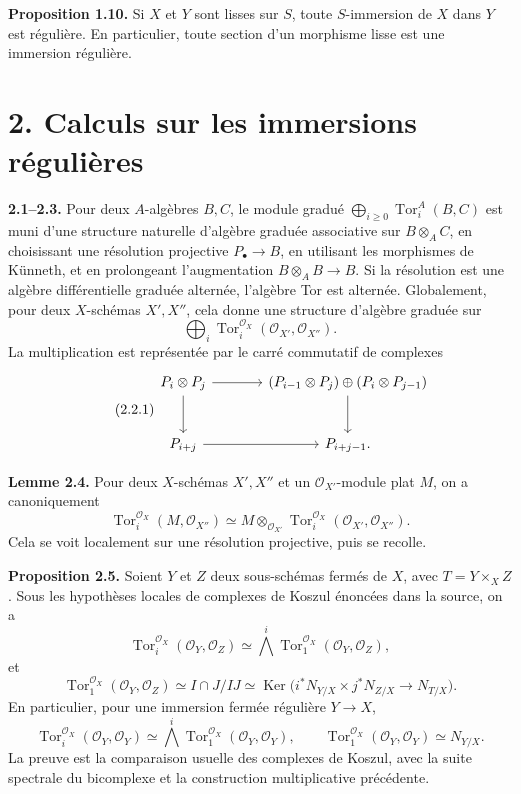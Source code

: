 \documentclass[11pt]{article}
\newcommand{\Tor}{\operatorname{Tor}}
\providecommand{\Tor}{\operatorname{Tor}}
\providecommand{\Ker}{\operatorname{Ker}}
\providecommand{\cO}{\mathcal O}
\begin{document}
\textbf{Proposition 1.10.} Si \(X\) et \(Y\) sont lisses sur \(S\), toute \(S\)-immersion de \(X\) dans \(Y\) est régulière. En particulier, toute section d'un morphisme lisse est une immersion régulière.

\section*{2. Calculs sur les immersions régulières}

\textbf{2.1--2.3.} Pour deux \(A\)-algèbres \(B,C\), le module gradué \(\bigoplus_{i\ge0}\Tor_i^A(B,C)\) est muni d'une structure naturelle d'algèbre graduée associative sur \(B\otimes_A C\), en choisissant une résolution projective \(P_\bullet\to B\), en utilisant les morphismes de Künneth, et en prolongeant l'augmentation \(B\otimes_A B\to B\). Si la résolution est une algèbre différentielle graduée alternée, l'algèbre Tor est alternée. Globalement, pour deux \(X\)-schémas \(X',X''\), cela donne une structure d'algèbre graduée sur
\[
\bigoplus_i\Tor_i^{\cO_X}(\cO_{X'},\cO_{X''}).
\]
La multiplication est représentée par le carré commutatif de complexes
\begin{equation}\tag{2.2.1}
\begin{tikzcd}[column sep=large,row sep=large]
P_i\otimes P_j \arrow[r] \arrow[d] & (P_{i-1}\otimes P_j)\oplus(P_i\otimes P_{j-1}) \arrow[d]\\
P_{i+j} \arrow[r] & P_{i+j-1}.
\end{tikzcd}
\end{equation}

\textbf{Lemme 2.4.} Pour deux \(X\)-schémas \(X',X''\) et un \(\cO_{X'}\)-module plat \(M\), on a canoniquement
\begin{equation}\tag{2.4.1}
\Tor_i^{\cO_X}(M,\cO_{X''})\simeq
M\otimes_{\cO_{X'}}\Tor_i^{\cO_X}(\cO_{X'},\cO_{X''}).
\end{equation}
Cela se voit localement sur une résolution projective, puis se recolle.

\textbf{Proposition 2.5.} Soient \(Y\) et \(Z\) deux sous-schémas fermés de \(X\), avec \(T=Y\times_XZ\). Sous les hypothèses locales de complexes de Koszul énoncées dans la source, on a
\begin{equation}\tag{2.5.1}
\Tor_i^{\cO_X}(\cO_Y,\cO_Z)\simeq \bigwedge^i\Tor_1^{\cO_X}(\cO_Y,\cO_Z),
\end{equation}
et
\begin{equation}\tag{2.5.2}
\Tor_1^{\cO_X}(\cO_Y,\cO_Z)
\simeq I\cap J/IJ
\simeq \Ker\bigl(i^*N_{Y/X}\times j^*N_{Z/X}\to N_{T/X}\bigr).
\end{equation}
En particulier, pour une immersion fermée régulière \(Y\to X\),
\begin{equation}\tag{2.5.3}
\Tor_i^{\cO_X}(\cO_Y,\cO_Y)\simeq
\bigwedge^i\Tor_1^{\cO_X}(\cO_Y,\cO_Y),
\qquad
\Tor_1^{\cO_X}(\cO_Y,\cO_Y)\simeq N_{Y/X}.
\end{equation}
La preuve est la comparaison usuelle des complexes de Koszul, avec la suite spectrale du bicomplexe et la construction multiplicative précédente.
\end{document}
